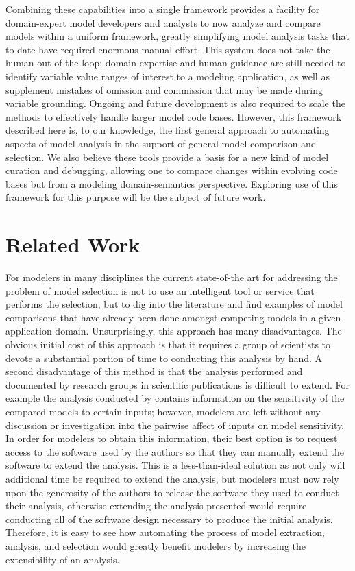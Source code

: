 Combining these capabilities into a single framework provides a facility for domain-expert model developers and analysts to now analyze and compare models within a uniform framework, greatly simplifying model analysis tasks that to-date have required enormous manual effort.
This system does not take the human out of the loop: domain expertise and human guidance are still needed to identify variable value ranges of interest to a modeling application, as well as supplement mistakes of omission and commission that may be made during variable grounding.
Ongoing and future development is also required to scale the methods to effectively handle larger model code bases.
However, this framework described here is, to our knowledge, the first general approach to automating aspects of model analysis in the support of general model comparison and selection.
We also believe these tools provide a basis for a new kind of model curation and debugging, allowing one to compare changes within evolving code bases but from a modeling domain-semantics perspective. Exploring use of this framework for this purpose will be the subject of future work.

\section{Related Work\label{sec:prior_work}}
For modelers in many disciplines the current state-of-the art for addressing the problem of model selection is not to use an intelligent tool or service that performs the selection, but to dig into the literature and find examples of model comparisons that have already been done amongst competing models in a given application domain.
Unsurprisingly, this approach has many disadvantages.
The obvious initial cost of this approach is that it requires a group of scientists to devote a substantial portion of time to conducting this analysis by hand.
A second disadvantage of this method is that the analysis performed and documented by research groups in scientific publications is difficult to extend.
For example the analysis conducted by \citet{camargo2016six} contains information on the sensitivity of the compared models to certain inputs; however, modelers are left without any discussion or investigation into the pairwise affect of inputs on model sensitivity.
In order for modelers to obtain this information, their best option is to request access to the software used by the authors so that they can manually extend the software to extend the analysis.
This is a less-than-ideal solution as not only will additional time be required to extend the analysis, but modelers must now rely upon the generosity of the authors to release the software they used to conduct their analysis, otherwise extending the analysis presented would require conducting all of the software design necessary to produce the initial analysis.
Therefore, it is easy to see how automating the process of model extraction, analysis, and selection would greatly benefit modelers by increasing the extensibility of an analysis.

